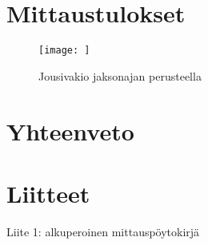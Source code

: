 \documentclass[a4paper, 12pt]{article}
\begin{document}
  

        \begin{equation}\label{kaava 12}
           
        \end{equation}


   












\section{Mittaustulokset }






            
            \begin{figure}[h]
                \centering
                \texttt{[image: ]}
                \caption{Jousivakio jaksonajan perusteella}
                \end{figure}
           
            \section{}
            
           
            
            
            
            \section{Yhteenveto}
            
           
            
            
            
            
            
            
            
            
            
            \section*{Liitteet}
            
            Liite 1: alkuperoinen mittauspöytokirjä
            
            
            
            
            
\end{document}
